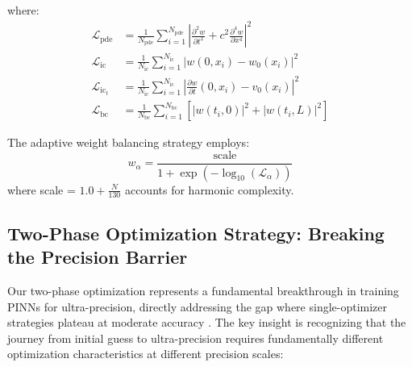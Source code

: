 where:
\begin{align}
\mathcal{L}_{\text{pde}} &= \frac{1}{N_{\text{pde}}} \sum_{i=1}^{N_{\text{pde}}} \left|\frac{\partial^2 w}{\partial t^2} + c^2 \frac{\partial^4 w}{\partial x^4}\right|^2 \\
\mathcal{L}_{\text{ic}} &= \frac{1}{N_{\text{ic}}} \sum_{i=1}^{N_{\text{ic}}} |w(0, x_i) - w_0(x_i)|^2 \\
\mathcal{L}_{\text{ic}_t} &= \frac{1}{N_{\text{ic}}} \sum_{i=1}^{N_{\text{ic}}} \left|\frac{\partial w}{\partial t}(0, x_i) - v_0(x_i)\right|^2 \\
\mathcal{L}_{\text{bc}} &= \frac{1}{N_{\text{bc}}} \sum_{i=1}^{N_{\text{bc}}} \left[|w(t_i, 0)|^2 + |w(t_i, L)|^2\right]
\end{align}

The adaptive weight balancing strategy \cite{wang2021understanding,mcclenny2020self} employs:
\begin{equation}
w_{\alpha} = \frac{\text{scale}}{1 + \exp(-\log_{10}(\mathcal{L}_{\alpha}))}
\end{equation}
where scale = $1.0 + \frac{N}{130}$ accounts for harmonic complexity.

\subsection{Two-Phase Optimization Strategy: Breaking the Precision Barrier}

Our two-phase optimization represents a fundamental breakthrough in training PINNs for ultra-precision, directly addressing the gap where single-optimizer strategies plateau at moderate accuracy \cite{penwarden2023unified}. The key insight is recognizing that the journey from initial guess to ultra-precision requires fundamentally different optimization characteristics at different precision scales:

